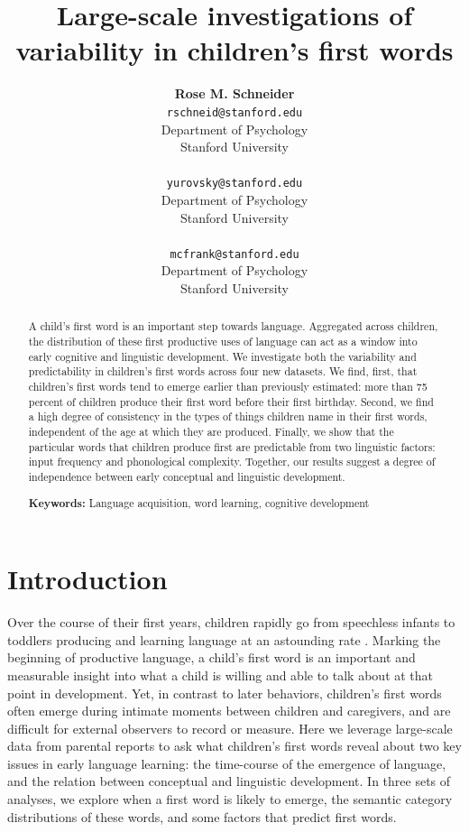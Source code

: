 \documentclass[10pt,letterpaper]{article}
\title{Large-scale investigations of variability in children's first words}
\author{{\large \bf Rose M. Schneider} \\ \texttt{rschneid@stanford.edu}\\ Department of Psychology \\ Stanford University \\ 
\And {\large \bf Daniel Yurovsky} \\ \texttt{yurovsky@stanford.edu} \\ Department of Psychology \\ Stanford University \\ 
\And {\large \bf Michael C. Frank} \\ \texttt{mcfrank@stanford.edu} \\ Department of Psychology \\ Stanford University \\ }
\begin{document}
\maketitle


\begin{abstract}
A child's first word is an important step towards language. Aggregated across children, the distribution of these first productive uses of language can act as a window into early cognitive and linguistic development. We investigate both the variability and predictability in children's first words across four new datasets. We find, first, that children's first words tend to emerge earlier than previously estimated: more than 75 percent of children produce their first word before their first birthday. Second, we find a high degree of consistency in the types of things children name in their first words, independent of the age at which they are produced. Finally, we show that the particular words that children produce first are predictable from two linguistic factors: input frequency and phonological complexity. Together, our results suggest a degree of independence between early conceptual and linguistic development.

\textbf{Keywords:}
Language acquisition, word learning, cognitive development
\end{abstract}

\section{Introduction}

Over the course of their first years, children rapidly go from speechless infants to toddlers producing and learning language at an astounding rate \cite{fenson1994}. Marking the beginning of productive language, a child's first word is an important and measurable insight into what a child is willing and able to talk about at that point in development. Yet, in contrast to later behaviors, children's first words often emerge during intimate moments between children and caregivers, and are difficult for external observers to record or measure. Here we leverage large-scale data from parental reports to ask what children's first words reveal about two key issues in early language learning: the time-course of the emergence of language, and the relation between conceptual and linguistic development. In three sets of analyses, we explore when a first word is likely to emerge, the semantic category distributions of these words, and some factors that predict first words.
\end{document}
